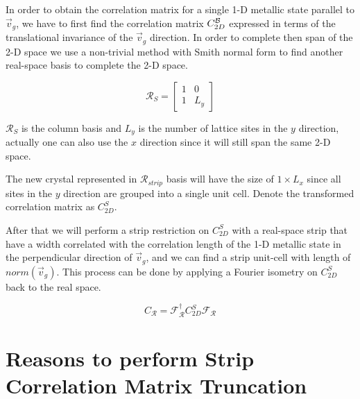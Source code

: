 \documentclass[%
    reprint,
    amsmath,amssymb,
    aps,
    floatfix,
]{revtex4-2}
\theoremstyle{plain}
\begin{document}
In order to obtain the correlation matrix for a single 1-D metallic state parallel to $\vec{v}_{g}$, we have to first find 
the correlation matrix $C_{2D}^{\mathcal{B}}$ expressed in terms of the translational invariance of the $\vec{v}_{g}$ direction. In order 
to complete then span of the 2-D space we use a non-trivial method with Smith normal form to find another real-space basis 
to complete the 2-D space.

\begin{equation}
    \label{eq:StripRealSpaceBasis}
    \mathcal{R}_{S} =
    \begin{bmatrix}
        1 & 0 \\
        1 & L_y
    \end{bmatrix}
\end{equation}

$\mathcal{R}_{S}$ is the column basis and $L_y$ is the number of lattice sites in the $y$ direction, actually one can also 
use the $x$ direction since it will still span the same 2-D space.

\newcommand\scaledcorrelations{C_{2D}^{S}}

The new crystal represented in $\mathcal{R}_{strip}$ basis will have the size of $1 \times L_x$ since all sites in the $y$ direction 
are grouped into a single unit cell. Denote the transformed correlation matrix as $\scaledcorrelations$.

After that we will perform a strip restriction on $\scaledcorrelations$ with a real-space strip that have a width correlated with the 
correlation length of the 1-D metallic state in the perpendicular direction of $\vec{v}_{g}$, and we can find a strip unit-cell with 
length of $norm(\vec{v}_{g})$. This process can be done by applying a Fourier isometry on $\scaledcorrelations$ back to the real space.

\newcommand\restrictedfourier{\mathcal{F}_{\mathcal{R}}}

\begin{equation}
    \label{eq:StripUnitCellRestrictedCorrelations}
    C_{\mathcal{R}} = \restrictedfourier^{\dagger} \scaledcorrelations \restrictedfourier
\end{equation}

\section{Reasons to perform Strip Correlation Matrix Truncation}
\end{document}
